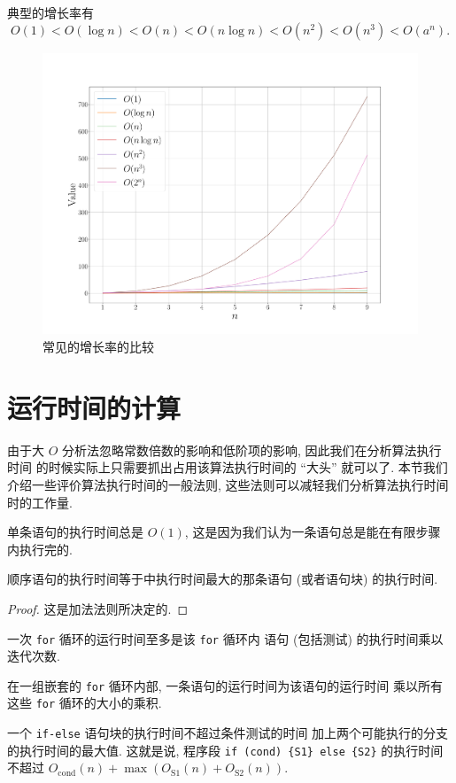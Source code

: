 \documentclass[10pt,UTF8]{book} %
\begin{document}
\newpage
典型的增长率有
\[ O\left(1\right) < O\left(\log n\right) < O\left(n\right) < O\left(n \log n\right) < O\left(n^2\right) < O\left(n^3\right) < O\left(a^n\right). \]
\begin{figure}[H]
    \centering
    \includegraphics*[width=\textwidth]{pic/growth_rate_comparison.pdf}
    \caption{常见的增长率的比较}
\end{figure}

\section{运行时间的计算}

由于大 $O$ 分析法忽略常数倍数的影响和低阶项的影响, 因此我们在分析算法执行时间
的时候实际上只需要抓出占用该算法执行时间的 “大头” 就可以了.
本节我们介绍一些评价算法执行时间的一般法则, 这些法则可以减轻我们分析算法执行时间
时的工作量.

\begin{thm}
    单条语句的执行时间总是 $O(1)$, 这是因为我们认为一条语句总是能在有限步骤
    内执行完的.
\end{thm}
\begin{thm}
    顺序语句的执行时间等于中执行时间最大的那条语句 (或者语句块) 的执行时间.
\end{thm}
\begin{proof}
    这是加法法则所决定的.
\end{proof}
\begin{thm}
    一次 \lstinline|for| 循环的运行时间至多是该 \lstinline|for| 循环内
    语句 (包括测试) 的执行时间乘以迭代次数.
\end{thm}
\begin{thm}
    在一组嵌套的 \lstinline|for| 循环内部, 一条语句的运行时间为该语句的运行时间
    乘以所有这些 \lstinline|for| 循环的大小的乘积.
\end{thm}
\begin{thm}
    一个 \lstinline|if-else| 语句块的执行时间不超过条件测试的时间
    加上两个可能执行的分支的执行时间的最大值. 这就是说, 
    程序段
    \lstinline|if (cond) {S1} else {S2}| 的执行时间
    不超过 $O_\mathrm{cond}(n) + \max(O_\mathrm{S1}(n)+O_\mathrm{S2}(n))$.
\end{thm}
\end{document}

